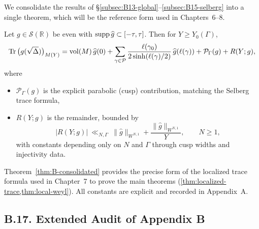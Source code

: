 We consolidate the results of \S\ref{subsec:B13-global}–\ref{subsec:B15-selberg}
into a single theorem, which will be the reference form used in Chapters~6–8.

\begin{theorem}
\label{thm:B-consolidated}
Let $g\in \mathcal S(\mathbb R)$ be even with $\operatorname{supp} \widehat g \subset [-\tau,\tau]$.
Then for $Y\ge Y_0(\Gamma)$,
\[
\operatorname{Tr}\big(g(\sqrt\Delta)\big)_{M(Y)}
=\operatorname{vol}(M)\,\widehat g(0)
+\sum_{\gamma\in\mathcal P} \frac{\ell(\gamma_0)}{2\sinh(\ell(\gamma)/2)}\,\widehat g(\ell(\gamma))
+\mathcal P_{\Gamma}(g) + R(Y;g),
\]
where
\begin{itemize}
  \item $\mathcal P_{\Gamma}(g)$ is the explicit parabolic (cusp) contribution,
        matching the Selberg trace formula,
  \item $R(Y;g)$ is the remainder, bounded by
  \[
  |R(Y;g)| \ \ll_{N,\Gamma}\ \|\widehat g\|_{W^{N,1}} + \frac{\|\widehat g\|_{W^{N,1}}}{Y},\qquad N\ge1,
  \]
  with constants depending only on $N$ and $\Gamma$ through cusp widths and injectivity data.
\end{itemize}
\end{theorem}

\begin{remark}
Theorem~\ref{thm:B-consolidated} provides the precise form of the localized trace
formula used in Chapter~7 to prove the main theorems
(\cref{thm:localized-trace,thm:local-weyl}).
All constants are explicit and recorded in Appendix~A.
\end{remark}


\subsection*{B.17. Extended Audit of Appendix B}

